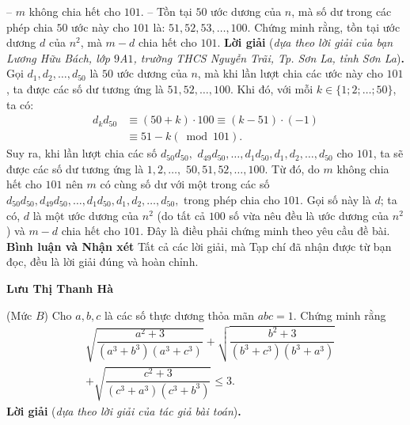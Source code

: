 \begin{multicols}{2}
	\vskip 0.05cm
	-- $m$ không chia hết cho $101$.
	\vskip 0.05cm
	-- Tồn tại $50$ ước dương của $n$, mà số dư trong các phép chia $50$ ước này cho $101$ là: $51, 52, 53, \ldots, 100.$ 
	\vskip 0.05cm
	Chứng minh rằng, tồn tại ước dương $d$ của $n^2$, mà $m-d$ chia hết cho $101$.
	\vskip 0.05cm
	\textbf{\color{thachthuctoanhoc}Lời giải} (\textit{dựa theo lời giải của bạn Lương Hữu Bách, lớp $9$A$1$, trường THCS Nguyễn Trãi, Tp. Sơn La, tỉnh Sơn La})\textbf{\color{thachthuctoanhoc}.}
	\vskip 0.05cm
	Gọi $d_1, d_2, \ldots, d_{50}$ là $50$ ước dương của $n$, mà khi lần lượt chia các ước này cho $101$, ta được các số dư tương ứng là $51, 52, \ldots, 100$.
	\vskip 0.05cm
	Khi đó, với mỗi $k \in \{1; 2; \ldots; 50\}$, ta có:
	\begin{align*}
		{d_k}{d_{50}} &\equiv \left( {50 + k} \right) \cdot 100 \equiv \left( {k - 51} \right) \cdot \left( { - 1} \right) \\
		&\equiv 51 - k\left( {\bmod 101} \right).
	\end{align*}
	Suy ra, khi lần lượt chia các số  ${d_{50}}{d_{50}},$ ${d_{49}}{d_{50}}, \ldots,{d_1}{d_{50}},d_1, d_2,\ldots,d_{50}$   cho $101$, ta sẽ được các số dư tương ứng là $1, 2,\ldots,$ $50, 51, 52, \ldots, 100$.
	\vskip 0.05cm
	Từ đó, do $m$ không chia hết cho $101$ nên $m$ có cùng số dư với một trong các số  $d_{50}d_{50},d_{49}d_{50}, \ldots,d_1d_{50},d_1,d_2, \ldots,d_{50},$ trong phép chia cho $101$. Gọi số này là $d$; ta có, $d$ là một ước dương của $n^2$ (do tất cả $100$ số vừa nêu đều là ước dương của $n^2$) và $m - d$ chia hết cho $101$. Đây là điều phải chứng minh theo yêu cầu đề bài.
	\vskip 0.05cm
	\textbf{\color{thachthuctoanhoc}Bình luận và Nhận xét}
	\vskip 0.05cm
	Tất cả các lời giải, mà Tạp chí đã nhận được từ bạn đọc, đều là lời giải đúng và hoàn chỉnh.
	\begin{flushright}
		\textbf{\color{thachthuctoanhoc}Lưu Thị Thanh Hà}
	\end{flushright}
	{}
	(Mức $B$) Cho $a, b, c$ là các số thực dương thỏa mãn $a b c=1$. Chứng minh rằng
	\begin{align*}
		&\sqrt{\dfrac{a^2\!+\!3}{\left(a^3\!+\!b^3\right)\!\left(a^3\!+\!c^3\right)}}\!+\!\sqrt{\dfrac{b^2\!+\!3}{\left(b^3\!+\!c^3\right)\!\left(b^3\!+\!a^3\right)}}\\
		&+\sqrt{\dfrac{c^2\!+\!3}{\left(c^3\!+\!a^3\right)\!\left(c^3\!+\!b^3\right)}} \leq 3.
	\end{align*}
	\textbf{\color{thachthuctoanhoc}Lời giải} (\textit{dựa theo lời giải của tác giả bài toán})\textbf{\color{thachthuctoanhoc}.}

\end{multicols}
